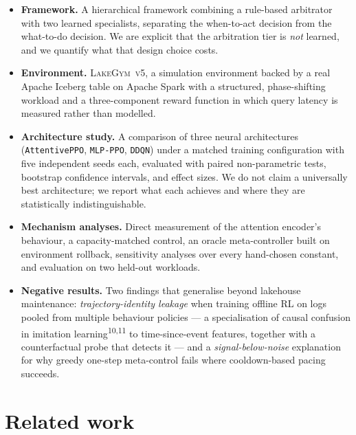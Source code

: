 \documentclass[fleqn,10pt]{wlscirep}
\newcommand{\env}{\textsc{LakeGym~v5}}
\newcommand{\attentive}{\texttt{AttentivePPO}}
\newcommand{\mlpppo}{\texttt{MLP-PPO}}
\newcommand{\ddqn}{\texttt{DDQN}}
\begin{document}
\begin{itemize}
\item \textbf{Framework.} A hierarchical framework combining a
  rule-based arbitrator with two learned specialists, separating the
  when-to-act decision from the what-to-do decision. We are explicit
  that the arbitration tier is \emph{not} learned, and we quantify what
  that design choice costs.

\item \textbf{Environment.} \env{}, a simulation environment backed by
  a real Apache Iceberg table on Apache Spark with a structured,
  phase-shifting workload and a three-component reward function in which
  query latency is measured rather than modelled.

\item \textbf{Architecture study.} A comparison of three neural
  architectures (\attentive{}, \mlpppo{}, \ddqn{}) under a matched
  training configuration with five independent seeds each, evaluated
  with paired non-parametric tests, bootstrap confidence intervals, and
  effect sizes. We do not claim a universally best architecture; we
  report what each achieves and where they are statistically
  indistinguishable.

\item \textbf{Mechanism analyses.} Direct measurement of the attention
  encoder's behaviour, a capacity-matched control, an oracle
  meta-controller built on environment rollback, sensitivity analyses
  over every hand-chosen constant, and evaluation on two held-out
  workloads.

\item \textbf{Negative results.} Two findings that generalise beyond
  lakehouse maintenance: \emph{trajectory-identity leakage} when
  training offline RL on logs pooled from multiple behaviour policies
  --- a specialisation of causal confusion in imitation
  learning\textsuperscript{10,11} to time-since-event features,
  together with a counterfactual probe that detects it --- and a
  \emph{signal-below-noise} explanation for why greedy one-step
  meta-control fails where cooldown-based pacing succeeds.
\end{itemize}

\FloatBarrier

\section*{Related work}
\label{sec:related}
\end{document}
